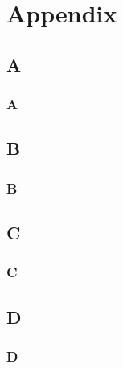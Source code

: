 \part{Appendix}
\appendix
\chapter{A}\label{app:reqquestion}
\section{A}

\chapter{B}\label{app:reqanswer}
\section{B}

\chapter{C}\label{app:reqgroup1}
\section{C}

\chapter{D}
\section{D}
